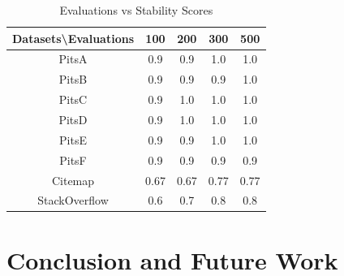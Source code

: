 \documentclass[10pt,conference]{IEEEtran}
\theoremstyle{break}
\begin{document}

\begin{table}[!htbp]
\begin{center}
\begin{tabular}{|c|c|c|c|c|}
\hline 
\textbf{Datasets\textbackslash Evaluations} & \textbf{100} & \textbf{200} & \textbf{300} &
\textbf{500} \\[0.5ex]
\hline
PitsA & 0.9 & 0.9 & 1.0 & 1.0\\ 
\hline
PitsB & 0.9 & 0.9 & 0.9 & 1.0 \\
\hline
PitsC & 0.9 & 1.0 & 1.0 & 1.0\\ 
\hline
PitsD & 0.9 & 1.0 & 1.0 & 1.0\\ 
\hline
PitsE & 0.9 & 0.9 & 1.0 & 1.0\\
\hline
PitsF & 0.9 & 0.9 & 0.9 & 0.9\\
\hline
Citemap & 0.67 & 0.67 & 0.77 & 0.77\\
\hline
StackOverflow & 0.6 & 0.7 & 0.8 & 0.8\\
\hline
\end{tabular}
\end{center}
\caption{Evaluations vs Stability Scores}
\label{tb:tablename1}
\end{table}


\section{Conclusion and Future Work}
\end{document}
